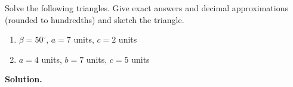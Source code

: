 \begin{ex}  \label{locex}  Solve the following triangles.  Give exact answers and decimal approximations (rounded to hundredths) and sketch the triangle.

\begin{multicols}{2}

\begin{enumerate}

\item  \label{locsas} $\beta = 50^{\circ}$, $a = 7$ units, $c=2$ units

\item  \label{locsss} $a=4$ units, $b=7$ units, $c = 5$ units

\end{enumerate}

\end{multicols}

{\bf Solution.}

\begin{enumerate}


\end{enumerate}
\end{ex}

